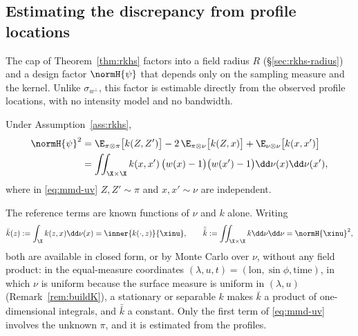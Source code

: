 \subsection{Estimating the discrepancy from profile locations}
\label{sec:rkhs-estimation}

The cap of Theorem~\ref{thm:rkhs} factors into a field radius $R$
(\S\ref{sec:rkhs-radius}) and a design factor $\normH{\psi}$ that depends only
on the sampling measure and the kernel. Unlike $\sigma_{w^{\perp}}$, this factor
is estimable directly from the observed profile locations, with no intensity
model and no bandwidth.

\begin{proposition}
\label{prop:mmd-closed}
Under Assumption~\ref{ass:rkhs},
\begin{align}
  \normH{\psi}^2
  &=\E_{\pi\otimes\pi}\big[k(Z,Z')\big]
    -2\,\E_{\pi\otimes\nu}\big[k(Z,x)\big]
    +\E_{\nu\otimes\nu}\big[k(x,x')\big]
  \label{eq:mmd-uv}\\
  &=\iint_{\X\times\X} k(x,x')\,\big(w(x)-1\big)\big(w(x')-1\big)\dd\nu(x)\dd\nu(x'),
  \label{eq:mmd-w}
\end{align}
where in \eqref{eq:mmd-uv} $Z,Z'\sim\pi$ and $x,x'\sim\nu$ are independent.
\end{proposition}

The reference terms are known functions of $\nu$ and $k$ alone. Writing
\[
  \bar k(z):=\int_\X k(z,x)\dd\nu(x)=\inner{k(\cdot,z)}{\xinu},
  \qquad
  \bar{\bar k}:=\iint_{\X\times\X} k\dd\nu\dd\nu=\normH{\xinu}^2 ,
\]
both are available in closed form, or by Monte Carlo over $\nu$, without any
field product: in the equal-measure coordinates
$(\lambda,u,t)=(\text{lon},\sin\phi,\text{time})$, in which $\nu$ is uniform
because the surface measure is uniform in $(\lambda,u)$ (Remark~\ref{rem:buildK}),
a stationary or separable $k$ makes $\bar k$ a
product of one-dimensional integrals, and $\bar{\bar k}$ a constant. Only the
first term of \eqref{eq:mmd-uv} involves the unknown $\pi$, and it is estimated
from the profiles.

